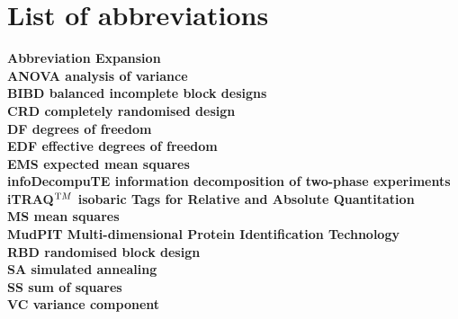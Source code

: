 \chapter*{List of abbreviations}



\begin{tabbing}
\bf{Abbreviation}  \hspace{50pt} \=  \bf{Expansion} \\
ANOVA \> analysis of variance\\
BIBD \> balanced incomplete block designs\\
CRD	\> completely randomised design \\
DF \> degrees of freedom\\
EDF \> effective degrees of freedom\\
EMS \> expected mean squares\\
infoDecompuTE \> information decomposition of two-phase experiments\\
iTRAQ$^{\textrm TM}$ \> isobaric Tags for Relative and Absolute Quantitation\\
MS \> mean squares\\
MudPIT\> Multi-dimensional Protein Identification Technology\\
RBD	\> randomised block design \\
SA \> simulated annealing\\
SS \> sum of squares\\
VC \> variance component\\
\end{tabbing}


